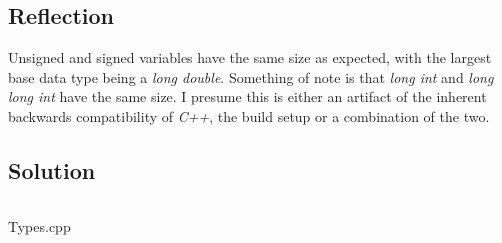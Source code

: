     \subsection*{Reflection}
        Unsigned and signed variables have the same size as expected, with
        the largest base data type being a \textit{long double}.
        Something of note is that \textit{long int} and \textit{long long int} have the same size.
        I presume this is either an artifact of the inherent backwards compatibility of \textit{C++},
        the build setup or a combination of the two.

    \subsection*{Solution}
        \begin{listing}[H]
            \inputminted[firstline=6]{cpp}{../Tasks/03-Types/Types.cpp}
            \caption{Types.cpp}
        \end{listing}